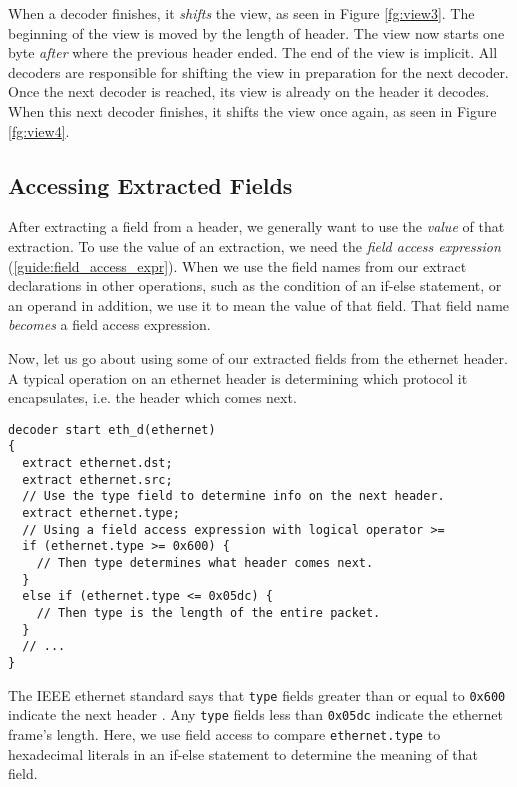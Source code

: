 When a decoder finishes, it \textit{shifts} the view, as seen in Figure \ref{fg:view3}. The beginning of the view is moved by the length of header. The view now starts one byte \textit{after} where the previous header ended. The end of the view is implicit. All decoders are responsible for shifting the view in preparation for the next decoder. Once the next decoder is reached, its view is already on the header it decodes. When this next decoder finishes, it shifts the view once again, as seen in Figure \ref{fg:view4}.

\subsection{Accessing Extracted Fields} \label{tut:decoder_access}

After extracting a field from a header, we generally want to use the \textit{value} of that extraction. To use the value of an extraction, we need the \textit{field access expression} (\ref{guide:field_access_expr}). When we use the field names from our extract declarations in other operations, such as the condition of an if-else statement, or an operand in addition, we use it to mean the value of that field. That field name \textit{becomes} a field access expression.

Now, let us go about using some of our extracted fields from the ethernet header. A typical operation on an ethernet header is determining which protocol it encapsulates, i.e. the header which comes next.

\begin{codepage}
\begin{lstlisting}
decoder start eth_d(ethernet) 
{
  extract ethernet.dst;
  extract ethernet.src;
  // Use the type field to determine info on the next header.
  extract ethernet.type;
  // Using a field access expression with logical operator >=
  if (ethernet.type >= 0x600) {
    // Then type determines what header comes next.
  }
  else if (ethernet.type <= 0x05dc) {
    // Then type is the length of the entire packet.
  }
  // ...
}
\end{lstlisting}
\end{codepage}

The IEEE ethernet standard says that \texttt{type} fields greater than or equal to \texttt{0x600} indicate the next header \cite{eth_std}. Any \texttt{type} fields less than \texttt{0x05dc} indicate the ethernet frame's length. Here, we use field access to compare \texttt{ethernet.type} to hexadecimal literals in an if-else statement to determine the meaning of that field.

